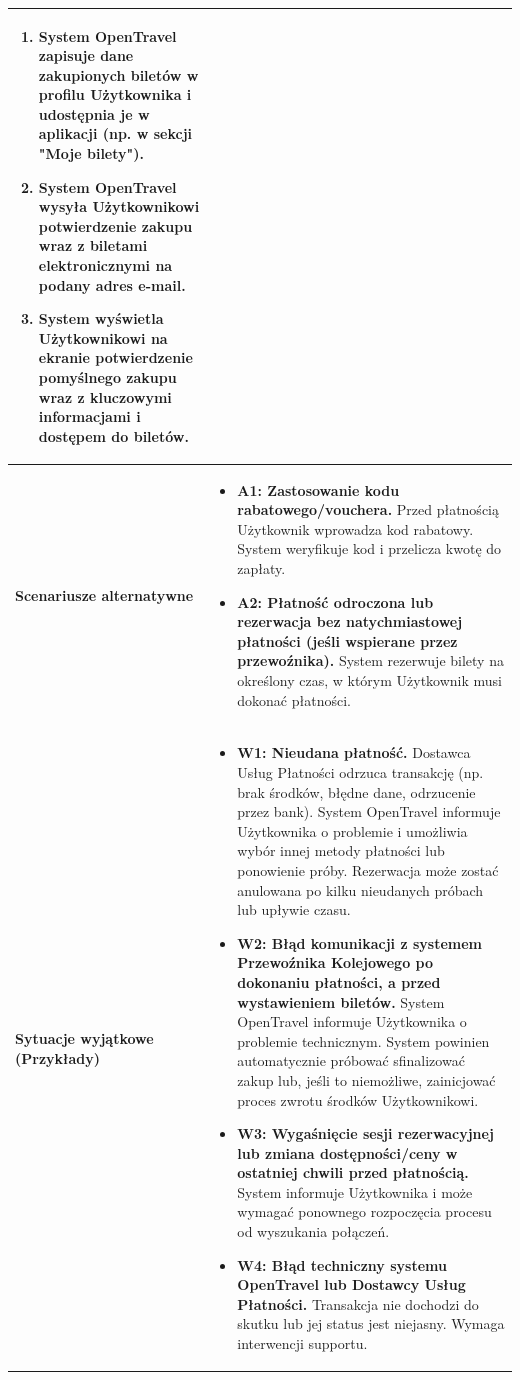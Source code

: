 \documentclass[a4paper,12pt]{article}
\begin{document}
\begin{longtable}{|p{\pierwszakolumnaszerokoscPUBKZakup}|p{\drugakolumnaszerokoscPUBKZakup}|}
\begin{enumerate}
            \item System OpenTravel zapisuje dane zakupionych biletów w profilu Użytkownika i udostępnia je w aplikacji (np. w sekcji "Moje bilety").
            \item System OpenTravel wysyła Użytkownikowi potwierdzenie zakupu wraz z biletami elektronicznymi na podany adres e-mail.
            \item System wyświetla Użytkownikowi na ekranie potwierdzenie pomyślnego zakupu wraz z kluczowymi informacjami i dostępem do biletów.
        \end{enumerate} \\
    \hline
    \textbf{Scenariusze alternatywne} &
        \begin{itemize} \itemsep0pt \parskip0pt \parsep0pt
            \item \textbf{A1: Zastosowanie kodu rabatowego/vouchera.} Przed płatnością Użytkownik wprowadza kod rabatowy. System weryfikuje kod i przelicza kwotę do zapłaty.
            \item \textbf{A2: Płatność odroczona lub rezerwacja bez natychmiastowej płatności (jeśli wspierane przez przewoźnika).} System rezerwuje bilety na określony czas, w którym Użytkownik musi dokonać płatności.
        \end{itemize} \\
    \hline
    \textbf{Sytuacje wyjątkowe (Przykłady)} &
        \begin{itemize} \itemsep0pt \parskip0pt \parsep0pt
            \item \textbf{W1: Nieudana płatność.} Dostawca Usług Płatności odrzuca transakcję (np. brak środków, błędne dane, odrzucenie przez bank). System OpenTravel informuje Użytkownika o problemie i umożliwia wybór innej metody płatności lub ponowienie próby. Rezerwacja może zostać anulowana po kilku nieudanych próbach lub upływie czasu.
            \item \textbf{W2: Błąd komunikacji z systemem Przewoźnika Kolejowego po dokonaniu płatności, a przed wystawieniem biletów.} System OpenTravel informuje Użytkownika o problemie technicznym. System powinien automatycznie próbować sfinalizować zakup lub, jeśli to niemożliwe, zainicjować proces zwrotu środków Użytkownikowi.
            \item \textbf{W3: Wygaśnięcie sesji rezerwacyjnej lub zmiana dostępności/ceny w ostatniej chwili przed płatnością.} System informuje Użytkownika i może wymagać ponownego rozpoczęcia procesu od wyszukania połączeń.
            \item \textbf{W4: Błąd techniczny systemu OpenTravel lub Dostawcy Usług Płatności.} Transakcja nie dochodzi do skutku lub jej status jest niejasny. Wymaga interwencji supportu.
        \end{itemize} \\
\end{longtable}
\endgroup
\end{document}
